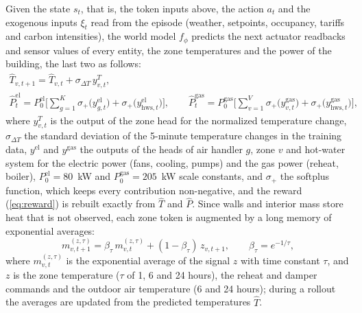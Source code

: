 \documentclass{article}
\begin{document}
Given the state $s_t$, that is, the token inputs above, the action $a_t$ and the exogenous inputs $\xi_t$ read from the episode (weather, setpoints, occupancy, tariffs and carbon intensities), the world model $f_\phi$ predicts the next actuator readbacks and sensor values of every entity, the zone temperatures and the power of the building, the last two as follows:
\begin{equation}
\begin{gathered}
\hat{T}_{v,t+1} = \hat{T}_{v,t} + \sigma_{\Delta T}\, y^{T}_{v,t}, \\
\hat{P}^{\mathrm{el}}_t = P^{\mathrm{el}}_{0} \Big[\sum_{g=1}^{K} \sigma_{+}\big(y^{\mathrm{el}}_{g,t}\big) + \sigma_{+}\big(y^{\mathrm{el}}_{\mathrm{hws},t}\big)\Big],
\qquad
\hat{P}^{\mathrm{gas}}_t = P^{\mathrm{gas}}_{0} \Big[\sum_{v=1}^{V} \sigma_{+}\big(y^{\mathrm{gas}}_{v,t}\big) + \sigma_{+}\big(y^{\mathrm{gas}}_{\mathrm{hws},t}\big)\Big],
\end{gathered}
\label{eq:wmout}
\end{equation}
where $y^{T}_{v,t}$ is the output of the zone head for the normalized temperature change, $\sigma_{\Delta T}$ the standard deviation of the 5-minute temperature changes in the training data, $y^{\mathrm{el}}$ and $y^{\mathrm{gas}}$ the outputs of the heads of air handler $g$, zone $v$ and hot-water system for the electric power (fans, cooling, pumps) and the gas power (reheat, boiler), $P^{\mathrm{el}}_{0} = 80$~kW and $P^{\mathrm{gas}}_{0} = 205$~kW scale constants, and $\sigma_{+}$ the softplus function, which keeps every contribution non-negative, and the reward (\ref{eq:reward}) is rebuilt exactly from $\hat{T}$ and $\hat{P}$. Since walls and interior mass store heat that is not observed, each zone token is augmented by a long memory of exponential averages:
\begin{equation}
m^{(z,\tau)}_{v,t+1} = \beta_\tau\, m^{(z,\tau)}_{v,t} + (1 - \beta_\tau)\, z_{v,t+1}, \qquad \beta_\tau = e^{-1/\tau},
\label{eq:memory}
\end{equation}
where $m^{(z,\tau)}_{v,t}$ is the exponential average of the signal $z$ with time constant $\tau$, and $z$ is the zone temperature ($\tau$ of 1, 6 and 24 hours), the reheat and damper commands and the outdoor air temperature (6 and 24 hours); during a rollout the averages are updated from the predicted temperatures $\hat{T}$.
\end{document}
